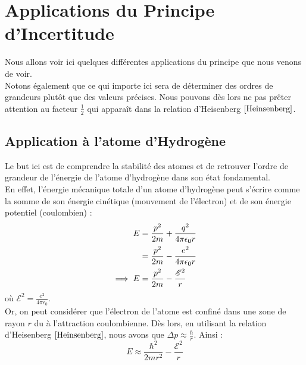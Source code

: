 \documentclass[../Notes de cours]{subfiles}
\begin{document}

\section{Applications du Principe d'Incertitude}

Nous allons voir ici quelques différentes applications du principe que nous venons de voir.\\
Notons également que ce qui importe ici sera de déterminer des ordres de grandeurs plutôt que des valeurs précises. Nous pouvons dès lors ne pas prêter attention au facteur $\frac{1}{2}$ qui apparaît dans la relation d'Heisenberg $\ref{Heinsenberg}$.

\subsection{Application à l'atome d'Hydrogène}
Le but ici est de comprendre la stabilité des atomes et de retrouver l'ordre de grandeur de l'énergie de l'atome d'hydrogène dans son état fondamental. \\

En effet, l'énergie mécanique totale d'un atome d'hydrogène peut s'écrire comme la somme de son énergie cinétique (mouvement de l'électron) et de son énergie potentiel (coulombien) : 
\begin{align}
\label{Energie hydrogène}
E &= \frac{p^2}{2m} + \frac{q^2}{4\pi \epsilon_0 r} \notag \\
&= \frac{p^2}{2m} - \frac{e^2}{4 \pi \epsilon_0 r} \notag \\
\implies E &= \frac{p^2}{2m} - \frac{\mathcal{E}^2}{r}
\end{align}
où $\mathcal{E}^2 = \frac{e^2}{4 \pi \epsilon_0}$.\\

Or, on peut considérer que l'électron de l'atome est confiné dans une zone de rayon $r$ du à l'attraction coulombienne. 
Dès lors, en utilisant la relation d'Heisenberg $\ref{Heinsenberg}$, nous avons que $\Delta p \approx \frac{\hbar}{r}$. Ainsi : 
\begin{equation}
\label{Energie hydrogene approx}
E \approx \frac{\hbar^2}{2mr^2} - \frac{\mathcal{E}^2}{r}
\end{equation}
\end{document}
